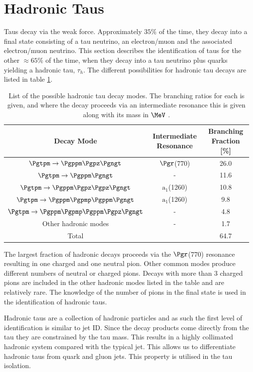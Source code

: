\section{Hadronic Taus}
\label{sec:taus}

Taus decay via the weak force. Approximately $35\%$ of the time, they decay into a final state consisting of a tau
neutrino, an electron/muon and the associated electron/muon neutrino. 
This section describes the identification of taus for the other $\approx65\%$ of the time,
when they decay into a tau neutrino plus quarks yielding a hadronic tau, $\tau_{h}$. The different
possibilities for hadronic tau decays are listed in table \ref{tab:hadronictaus}.

\begin{table}[bth]
\begin{tabular}{|c|c|c|}
\hline
Decay Mode & Intermediate Resonance & Branching Fraction [\%] \\
\hline
\hline
$\Pgtpm\to\Pgppm\Pgpz\Pgngt$ & $\Pgr$(770) & 26.0 \\
\hline
$\Pgtpm\to\Pgppm\Pgngt$ & -  & 11.6 \\
\hline
$\Pgtpm\to\Pgppm\Pgpz\Pgpz\Pgngt$ & $\text{a}_{1}$(1260) & 10.8 \\
\hline
$\Pgtpm\to\Pgppm\Pgpmp\Pgppm\Pgngt$ & $\text{a}_{1}$(1260) & 9.8 \\
\hline
$\Pgtpm\to\Pgppm\Pgpmp\Pgppm\Pgpz\Pgngt$ & -  & 4.8 \\
\hline
Other hadronic modes & - & 1.7 \\
\hline
\hline
Total & &  64.7 \\
\hline
\end{tabular}
\caption[List of the possible hadronic tau decay modes.]{List of the possible hadronic tau decay modes. The branching ratios for
each is given, and where the decay proceeds via an intermediate resonance this
is given along with its mass in $\MeV$ \cite{PDG}.}
\label{tab:hadronictaus}
\end{table}

The largest fraction of hadronic decays proceeds via the $\Pgr$(770) resonance
resulting in one charged and one neutral pion. Other common modes produce
different numbers of neutral or charged pions. Decays with more than 3 charged
pions are included in the other hadronic modes listed in the table and are
relatively rare. The knowledge of the number of pions in the final state is used in the
identification of hadronic taus.

Hadronic taus are a collection of hadronic particles and as such the first level
of identification is similar to jet ID. 
Since the decay products come directly from the tau they are constrained by the
tau mass. This results in a highly collimated hadronic system compared with the
typical jet. This allows us to differentiate hadronic taus from
quark and gluon jets. This property is utilised in the tau isolation.

